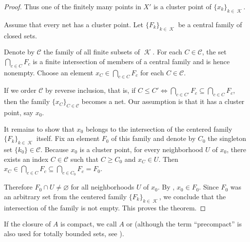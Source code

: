 \begin{proof}
  Thus one of the finitely many points in \( X' \) is a cluster point of \( \{ x_k \}_{k \in \mscrK} \).

   Assume that every net has a cluster point. Let \( \{ F_k \}_{k \in \mscrK} \) be a central family of closed sets.

  Denote by \( \mathcal C \) the family of all finite subsets of \( \mscrK \). For each \( C \in \mathcal C \), the set \( \bigcap_{c \in C} F_c \) is a finite intersection of members of a central family and is hence nonempty. Choose an element \( x_C \in \bigcap_{c \in C} F_c \) for each \( C \in \mathcal C \).

  If we order \( \mathcal C \) by reverse inclusion, that is, if \( C \leq C' \iff \bigcap_{c \in C'} F_c \subseteq \bigcap_{c \in C} F_c \), then the family \( \{ x_C \}_{C \in \mathcal C} \) becomes a net. Our assumption is that it has a cluster point, say \( x_0 \).

  It remains to show that \( x_0 \) belongs to the intersection of the centered family \( \{ F_k \}_{k \in \mscrK} \) itself. Fix an element \( F_0 \) of this family and denote by \( C_0 \) the singleton set \( \{ k_0 \} \in \mathcal C \). Because \( x_0 \) is a cluster point, for every neighborhood \( U \) of \( x_0 \), there exists an index \( C \in \mathcal C \) such that \( C \geq C_0 \) and \( x_C \in U \). Then \( x_C \in \bigcap_{c \in C} F_c \subseteq \bigcap_{c \in C_0} F_c = F_0 \).

  Therefore \( F_0 \cap U \neq \varnothing \) for all neighborhoods \( U \) of \( x_0 \). By , \( x_0 \in F_0 \). Since \( F_0 \) was an arbitrary set from the centered family \( \{ F_k \}_{k \in \mscrK} \), we conclude that the intersection of the family is not empty. This proves the theorem.
\end{proof}

\begin{remark}\label{rem:precompact_set}
  If the closure of \( A \) is compact, we call \( A \)  or  (although the term \enquote{precompact} is also used for totally bounded sets, see ).
\end{remark}

